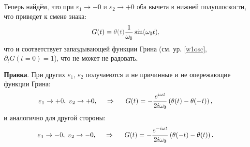 Теперь найдём, что при $\varepsilon_1 \to -0$ и $\varepsilon_2 \to + 0$ оба вычета в нижней полуплоскости, что приведет к смене знака:
\begin{equation*}
    G(t) = \textcolor{grey}{\theta (t)} \frac{1}{\omega_0} \sin(\omega_0 t),
\end{equation*}
что и соответствует запаздывающей функции Грина (см. ур. \eqref{w1osc}, $\partial_t G(t=0) = 1$), что не может не радовать. 



\textbf{Правка}. При других $\varepsilon_1,\, \varepsilon_2$ получаеются и не причинные и не опережающие функции Грина:
\begin{equation*}
    \varepsilon_1 \to + 0, \ \varepsilon_2 \to + 0,
    \hspace{0.5cm} \Rightarrow \hspace{0.5cm}
    G(t) = - \frac{e^{i \omega t}}{2 i \omega_0} \left(\theta(t) - \theta(-t)\right),
\end{equation*}
и аналогично для другой стороны:
\begin{equation*}
    \varepsilon_1 \to - 0, \ \varepsilon_2 \to - 0,
    \hspace{0.5cm} \Rightarrow \hspace{0.5cm}
    G(t) = - \frac{e^{-i \omega t}}{2 i \omega_0} \left(\theta(-t) - \theta(t)\right).
\end{equation*}

